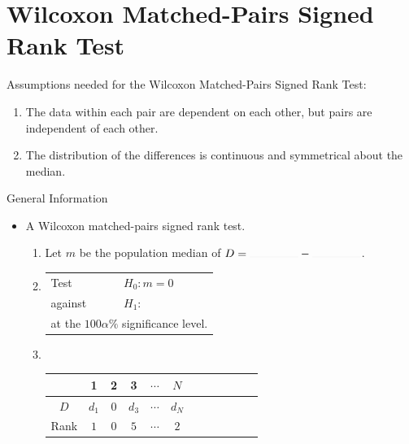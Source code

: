 \documentclass[../Notes.tex]{subfiles}
\begin{document}
\section{Wilcoxon Matched-Pairs Signed Rank Test}
\begin{note}
  Assumptions needed for the Wilcoxon Matched-Pairs Signed Rank Test:
  \begin{enumerate}
    \item The data within each pair are dependent on each other, but pairs are independent of each other.
    \item The distribution of the differences is continuous and symmetrical about the median.
  \end{enumerate}
\end{note}
\begin{stbox}{General Information}
  \begin{itemize}
    \item A Wilcoxon matched-pairs signed rank test. 
    \begin{enumerate}
      \item Let \(m\) be the population median of \(D=\rule{1.5cm}{0.01mm}-\rule{1.5cm}{0.01mm}\).
      \item 
      \begin{tabular}{|ll|}
        \hline
        Test & \(H_0\colon m=0\)\\
        against &\(H_1\colon\) 
        \begin{enumerate*}[itemjoin={\quad}]
          \item \(m<\highlight[yellow]{0}\),
          \item \(m\neq \highlight[yellow]{0}\),\quad or
          \item \(m>\highlight[yellow]{0}\),
        \end{enumerate*}\\
        \multicolumn{2}{|l|}{at the \(100\alpha\%\) significance level.}\\
        \hline
      \end{tabular}
      \item ~
      \begin{table}[H]
        \centering
        \begin{tabular}{|Sc|Sc|Sc|Sc|Sc|Sc|}
           & 1 & 2 & 3 & \(\cdots\) & \(N\)\\
          \hline 
          \(D\) & \(d_1\) & \(0\) & \(d_3\) & \(\cdots\) & \(d_N\)\\
          \hline
          Rank & \(1\) & \(0\) & \(5\) & \(\cdots\) & \(2\)\\

\end{tabular}
\end{table}
\end{enumerate}
\end{itemize}
\end{stbox}
\end{document}
